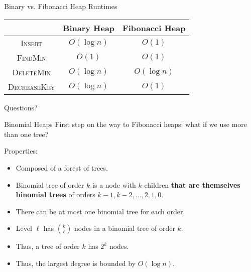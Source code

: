 \documentclass[aspectratio=169]{beamer}
\begin{document}
\begin{frame}{Binary vs. Fibonacci Heap Runtimes}
    \begin{center}
        \begin{tabular}{|c|c|c|}
            \hline
            & Binary Heap & Fibonacci Heap \\
            \hline
            \textsc{Insert} & \textcolor{sigma@mainblue}{$O(\log n)$} & \textcolor{sigma@mainblue}{$O(1)$} \\
            \textsc{FindMin} & \textcolor{sigma@mainblue}{$O(1)$} & \textcolor{sigma@mainblue}{$O(1)$}\\
            \textsc{DeleteMin} & \textcolor{sigma@mainblue}{$O(\log n)$} & \textcolor{sigma@mainblue}{$O(\log n)$} \\
            \textsc{DecreaseKey} & \textcolor{sigma@mainblue}{$O(\log n)$} & \textcolor{sigma@mainblue}{$O(1)$} \\
            \hline
        \end{tabular}
    \end{center}
\end{frame}


\begin{frame}{}
      \begin{center}
    {\color{sigma@mainblue} \LARGE Questions?}
  \end{center}
\end{frame}


\begin{frame}{Binomial Heaps}
    First step on the way to Fibonacci heaps: what if we use more than one tree?\pause
    
    Properties:
    \begin{itemize}
        \item Composed of a forest of trees.\pause
        \item Binomial tree of order $k$ is a node with $k$ children \textbf{that are themselves binomial trees} of orders $k - 1, k - 2, \ldots, 2, 1, 0$.\pause
        \item There can be at most one binomial tree for each order.\pause
        \item Level $\ell$ has $\binom{k}{\ell}$ nodes in a binomial tree of order $k$.\pause
        \item Thus, a tree of order $k$ has $2^k$ nodes.\pause
        \item Thus, the largest degree is bounded by \textcolor{sigma@mainblue}{$O(\log n)$}.
    \end{itemize}
\end{frame}
\end{document}
